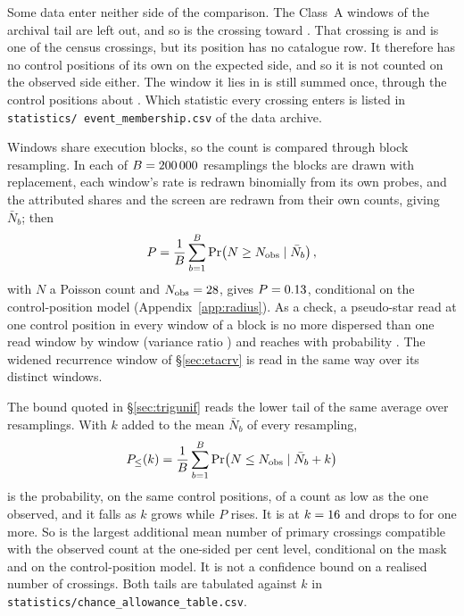 Some data enter neither side of the comparison. The \CeNWinTail{} Class~A
windows of the archival tail are left out, and so is the crossing toward
\CtUncatStar. That crossing is \MbUncatAttrWord{} and is one of the \CsNCross{}
census crossings, but its position has no catalogue row. It therefore has no
control positions of its own on the expected side, and so it is not counted
on the observed side either. The window it lies in is still summed once,
through the control positions about \MbUncatHost. Which statistic every
crossing enters is listed in \texttt{statistics/\allowbreak
event\_membership.csv} of the data archive.

Windows share execution blocks, so the count is compared through block
resampling. In each of $B=200\,000$ resamplings the blocks are drawn with
replacement, each window's rate is redrawn binomially from its own probes,
and the attributed shares and the screen are redrawn from their own counts,
giving $\bar N_b$; then
\begin{equation*}
P=\frac{1}{B}\sum_{b=1}^{B}\Pr\!\left(N\ge N_{\rm obs}\mid\bar N_b\right),
\end{equation*}
with $N$ a Poisson count and $N_{\rm obs}=28$, gives $P=0.13$,
conditional on the control-position model (Appendix~\ref{app:radius}). As
a check, a pseudo-star read at one control position in every window of
a block is no more dispersed than one read window by window (variance ratio
\BgDisp) and reaches \CeObs{} with probability \BgPseudoP. The widened recurrence window
of \S\ref{sec:etacrv} is read in the same way over its \WuNWin{} distinct
windows.

The bound quoted in \S\ref{sec:trigunif} reads the lower tail of the same
average over resamplings. With $k$ added to the mean $\bar N_b$ of every resampling,
\begin{equation*}
P_{\le}(k)=\frac{1}{B}\sum_{b=1}^{B}\Pr\!\left(N\le N_{\rm obs}\mid\bar N_b+k\right)
\end{equation*}
is the probability, on the same control positions, of a count as low as the
one observed, and it falls as $k$ grows while $P$ rises. It is
\CeProbAtLim{} at $k=16$ and drops to \CeProbAboveLim{} for one more.
So \CeAddLim{} is the largest additional mean number of primary crossings
compatible with the observed count at the one-sided \CeAlphaPct{} per cent
level, conditional on the mask and on the control-position model. It is not
a confidence bound on a realised number of crossings. Both tails are
tabulated against $k$ in
\texttt{statistics/\allowbreak chance\_allowance\_table.csv}.

